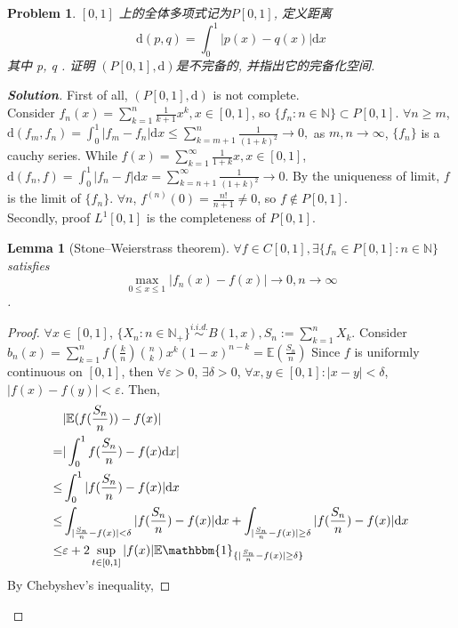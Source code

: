 \documentclass{ctexart}
\newtheorem{problem}{\textbf{Problem}}
\newenvironment{solution}{\begin{proof}[\textbf{Solution}]}{\end{proof}}
\renewcommand{\(}{\left(}
\renewcommand{\)}{\right)}
\renewcommand{\d}{\mathrm{d}}
\newcommand{\N}{\mathbb{N}}
\newcommand{\E}{\mathbb{E}}
\newcommand{\shi}{\mathbbm{1}}
\renewcommand{\epsilon}{\varepsilon}
\newtheorem{lemma}{Lemma}
\begin{document}
\newcommand{\intt}[2]{\int_0^1|#1-#2| \mathrm{d} x}
\begin{problem}
 $[0,1]$ 上的全体多项式记为$P[0,1]$, 定义距离
\begin{equation}
\d(p, q)=\int_0^1|p(x)-q(x)| \mathrm{d} x 
\end{equation}
其中 p, q . 证明
$(P[0,1],\d)$是不完备的, 并指出它的完备化空间.
\end{problem}
\begin{solution}
First of all, $(P[0,1],\d)$ is not complete.\\
Consider $f_n(x)=\sum_{k=1}^n \frac{1}{k+1}x^k,x\in [0,1]$, so $\{f_n:n\in \N\}\subset P[0,1]$.
 $\forall n\geq m$, $\d(f_m,f_n)=\intt{f_m}{f_n}\leq \sum_{k=m+1}^n \frac{1}{(1+k)^2}\to0,$ as $m,n\to\infty$, $\{f_n\}$ is a cauchy series.
  While $f(x)=\sum_{k=1}^{\infty}\frac{1}{1+k}x,x\in [0,1]$, $\d(f_n, f)=\intt{f_n}{f}=\sum_{k=n+1}^{\infty}\frac{1}{{(1+k)}^2}\to 0$.
   By the uniqueness of limit, $f$ is the limit of $\{f_n\}$. 
$\forall n$, $f^{(n)}(0)=\frac{n!}{n+1}\neq 0$, so $f\notin P[0,1]$.\\
Secondly, proof $L^1[0,1]$ is the completeness of $P[0,1]$.
\begin{lemma}[Stone–Weierstrass theorem]\label{lem:1}
$\forall f\in C[0,1],\exists \{f_n\in P[0,1]:n\in\N\}$ satisfies 
$$\max_{0\leq x\leq1}|f_n(x)-f(x)|\to 0, n\to\infty$$.
\end{lemma}
\begin{proof}
$\forall x\in[0,1]$, $\{X_n: n\in\N_+\}\stackrel{i.i.d.}{\sim} B(1,x), S_n:=\sum_{k=1}^n X_k$.
 Consider $b_n(x)=\sum_{k=1}^{n}f(\frac{k}{n})\binom{n}{k}x^k(1-x)^{n-k}=\E(\frac{S_n}{n})$
 Since $f$ is uniformly continuous on $[0,1]$, 
then $\forall \epsilon>0$, $\exists \delta>0$, $\forall x,y\in[0,1]:|x-y|<\delta$, $|f(x)-f(y)|<\epsilon$. Then,
\begin{equation}
 \begin{aligned}
&|\E(f(\frac{S_n}{n}))-f(x)|\\
=&|\int_0^1f(\frac{S_n}{n})-f(x)\d x|\\
\leq&\intt{f(\frac{S_n}{n})}{f(x)}\\
\leq&\int_{|\frac{S_n}{n}-f(x)|<\delta}|f(\frac{S_n}{n})-f(x)|\d x+\int_{|\frac{S_n}{n}-f(x)|\geq\delta}|f(\frac{S_n}{n})-f(x)|\d x\\
\leq&\epsilon+2\sup_{t\in[0,1]}|f(x)|\E{\shi_{\{|\frac{S_n}{n}-f(x)|\geq\delta\}}}
\end{aligned}
\end{equation}
By Chebyshev's inequality, 

\end{proof}
\end{solution}
\end{document}
